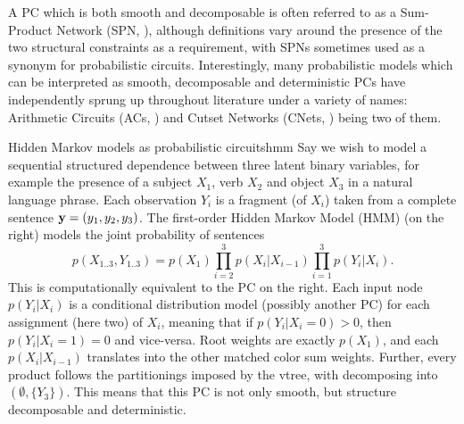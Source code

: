 A PC which is both smooth and decomposable is often referred to as a Sum-Product Network (SPN,
\cite{poon11}), although definitions vary around the presence of the two structural constraints
as a requirement, with SPNs sometimes used as a synonym for probabilistic circuits. 
Interestingly, many probabilistic models which can be interpreted as smooth, decomposable and
deterministic PCs have independently sprung up throughout literature under a variety of names:
Arithmetic Circuits (ACs, \cite{darwiche03}) and Cutset Networks (CNets, \cite{rahman14}) being two
of them.

\begin{example}[sidebyside,lefthand width=0.55\textwidth]{Hidden Markov models as probabilistic circuits}{hmm}
  Say we wish to model a sequential structured dependence between three latent binary variables, for
  example the presence of a subject $X_1$, verb $X_2$ and object $X_3$ in a natural language
  phrase. Each observation $Y_i$ is a fragment (of $X_i$) taken from a complete sentence
  $\mathbf{y}=(y_1,y_2,y_3)$. The first-order Hidden Markov Model (HMM) (on the right) models the
  joint probability of sentences
  \begin{equation}
    p(X_{1..3},Y_{1..3})=p(X_1)\prod_{i=2}^3 p(X_i|X_{i-1})\prod_{i=1}^3 p(Y_i|X_i).
  \end{equation}
  This is computationally equivalent to the PC on the right. Each input node $p(Y_i|X_i)$ is a
  conditional distribution model (possibly another PC) for each assignment (here two) of $X_i$,
  meaning that if $p(Y_i|X_i=0)>0$, then $p(Y_i|X_i=1)=0$ and vice-versa. Root weights are exactly
  $p(X_1)$, and each $p(X_i|X_{i-1})$ translates into the other matched color sum weights. Further,
  every product follows the partitionings imposed by the vtree, with
  \inode[fill=boxgray!80]{\newProdNode} decomposing into $(\emptyset,\{Y_3\})$. This means that
  this PC is not only smooth, but structure decomposable and deterministic.
  \tcblower
  \begin{center}


\end{center}
\end{example}
